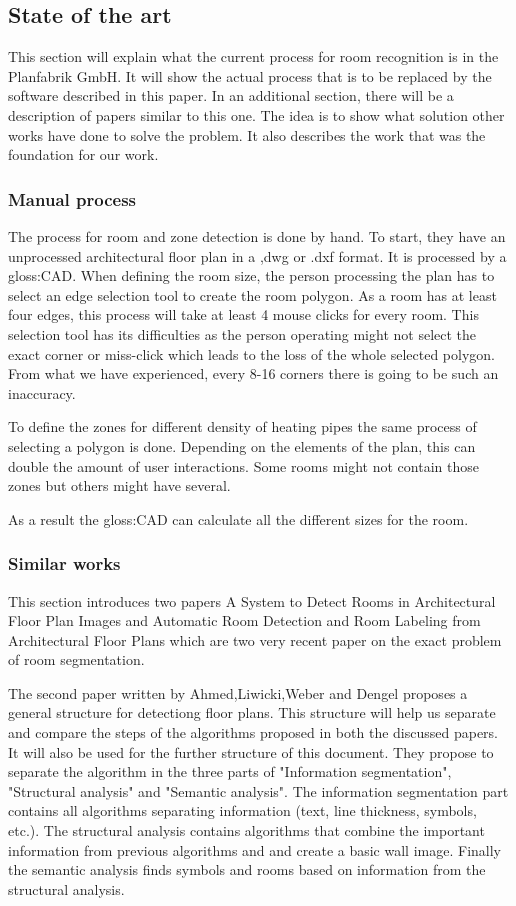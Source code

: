 \subsection{State of the art}
This section will explain what the current process for room recognition is in the Planfabrik GmbH. It will show the actual process that is to be replaced by the software described in this paper. In an additional section, there will be a description of papers similar to this one. The idea is to show what solution other works have done to solve the problem. It also describes the work that was the foundation for our work.

\subsubsection{Manual process}
 The process for room and zone detection is done by hand. To start, they have an unprocessed architectural floor plan in a ,dwg or .dxf format. It is processed by a \gls{gloss:CAD}. When defining the room size, the person processing the plan has to select an edge selection tool to create the room polygon. As a room has at least four edges, this process will take at least 4 mouse clicks for every room. This selection tool has its difficulties as the person operating might not select the exact corner or miss-click which leads to the loss of the whole selected polygon. From what we have experienced, every 8-16 corners there is going to be such an inaccuracy. 
 
 To define the zones for different density of heating pipes the same process of selecting a polygon is done. Depending on the elements of the plan, this can double the amount of user interactions. Some rooms might not contain those zones but others might have several.
 
 As a result the \gls{gloss:CAD} can calculate all the different sizes for the room.
 
\subsubsection{Similar works}
This section introduces two papers A System to Detect Rooms in Architectural Floor Plan Images \citep{mace_valveny_loctea_tabbone_2010} and Automatic Room Detection and Room Labeling from Architectural Floor Plans \citep{ahmed_liwicki_weber_dengel_2012} which are two very recent paper on the exact problem of room segmentation. 

The second paper written by Ahmed,Liwicki,Weber and Dengel proposes a general structure for detectiong floor plans. This structure will help us separate and compare the steps of the algorithms proposed in both the discussed papers. It will also be used for the further structure of this document. They propose to separate the algorithm in the three parts of "Information segmentation", "Structural analysis" and "Semantic analysis". The information segmentation part contains all algorithms separating information (text, line thickness, symbols, etc.). The structural analysis contains algorithms that combine the important information from previous algorithms and and create a basic wall image. Finally the semantic analysis finds symbols and rooms based on information from the structural analysis.

